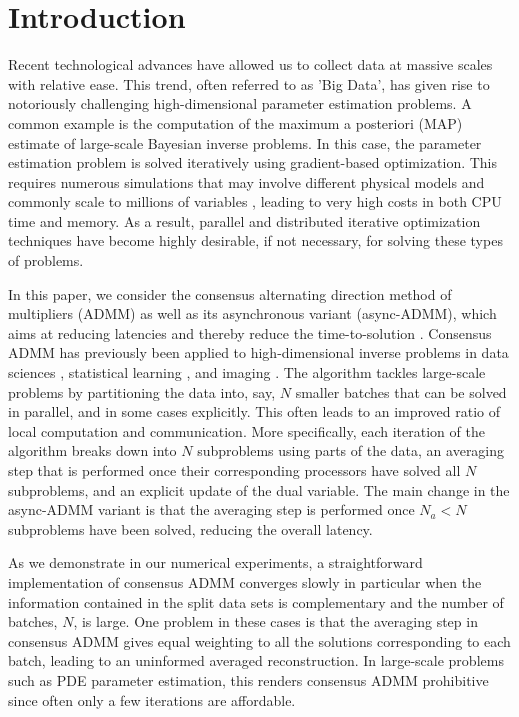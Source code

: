 \documentclass[11pt]{article}          %
\begin{document}
\section{Introduction}\label{sec:intro}
Recent technological advances have allowed us to collect data at massive scales with relative ease. This trend, often referred to as 'Big Data', has given rise to notoriously challenging high-dimensional parameter estimation problems. A common example is the computation of the {maximum a posteriori} (MAP) estimate \cite{calvetti2006large,stuart2010inverse} of large-scale Bayesian inverse problems. In this case, the parameter estimation problem is solved iteratively using gradient-based optimization. This requires numerous simulations that may involve different physical models and commonly scale to millions of variables \cite{biegler2003large}, leading to very high costs in both CPU time and memory. As a result, parallel and distributed iterative optimization techniques have become highly desirable, if not necessary, for solving these types of problems. 

In this paper, we consider the consensus alternating direction method of multipliers (ADMM) \cite{boyd2011distributed,goldstein2016unwrapping,huang2016consensus} as well as its asynchronous variant (async-ADMM), which aims at reducing latencies and thereby reduce the time-to-solution \cite{zhang2014asynchronous}. Consensus ADMM has previously been applied to high-dimensional inverse problems in data sciences \cite{miao2013hypergraph,ma2018fast}, statistical learning \cite{boyd2011distributed,xu2017adaptive,goldstein2016unwrapping,AAAIW1715174}, and imaging \cite{goldstein2014fast,juesas2015consensus,heredia2017norm}. The algorithm tackles large-scale problems by partitioning the data into, say, $N$ smaller batches that can be solved in parallel, and in some cases explicitly.
This often leads to an improved ratio of local computation and communication. 
 More specifically, each iteration of the algorithm breaks down into $N$ subproblems using parts of the data, an averaging step that is performed once their corresponding processors have solved all $N$ subproblems, and an explicit update of the dual variable. The main change in the async-ADMM variant is that the averaging step is performed once $N_a<N$ subproblems have been solved, reducing the overall latency.

As we demonstrate in our numerical experiments, a straightforward implementation of consensus ADMM converges slowly in particular when the information contained in the split data sets is complementary and the number of batches, $N$, is large. One problem in these cases is that the averaging step in consensus ADMM gives equal weighting to all the solutions corresponding to each batch, leading to an uninformed averaged reconstruction. 
In large-scale problems such as PDE parameter estimation, this renders consensus ADMM prohibitive since often only a few iterations are affordable.
\end{document}
